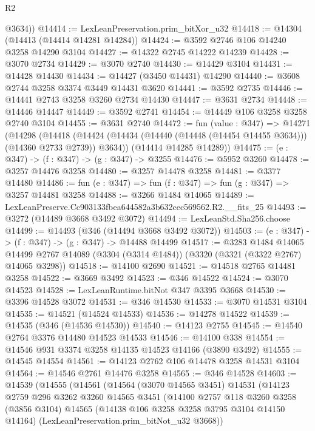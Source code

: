 \begin{lexlean}{R2}
\begin{coremodule}
        @3634))
@14414 := LexLeanPreservation.prim_bitXor_u32
@14418 := @14304 (@14413 (@14414 @14281 @14284))
@14424 := @3592 @2746 @106 @14240 @3258 @14290 @3104
@14427 := @14322 @2745 @14222 @14239
@14428 := @3070 @2734
@14429 := @3070 @2740
@14430 := @14429 @3104
@14431 := @14428 @14430
@14434 := @14427 (@3450 @14431) @14290
@14440 := @3608 @2744 @3258 @3374 @3449 @14431 @3620
@14441 := @3592 @2735
@14446 := @14441 @2743 @3258 @3260 @2734 @14430
@14447 := @3631 @2734
@14448 := @14446 @14447
@14449 := @3592 @2741
@14454 := @14449 @106 @3258 @3258 @2740 @3104
@14455 := @3631 @2740
@14472 := fun (value : @347) =>
  @14271
    (@14298
      (@14418 (@14424 (@14434 (@14440 (@14448 (@14454 @14455 @3634))) (@14360 @2733 @2739)) @3634))
      (@14414 @14285 @14289))
@14475 := (e : @347) -> (f : @347) -> (g : @347) -> @3255
@14476 := @5952 @3260
@14478 := @3257 @14476 @3258
@14480 := @3257 @14478 @3258
@14481 := @3377 @14480
@14486 := fun (e : @347) => fun (f : @347) => fun (g : @347) => @3257 @14481 @3258
@14488 := @3266 @1484 @14065
@14489 := LexLeanPreserve.Cc903133fbea644582a3b632cec569562.R2.__fits_25
@14493 := @3272 (@14489 @3668 @3492 @3072)
@14494 := LexLeanStd.Sha256.choose
@14499 := @14493 (@346 (@14494 @3668 @3492 @3072))
@14503 := (e : @347) -> (f : @347) -> (g : @347) -> @14488 @14499
@14517 := @3283
    @1484
    @14065
    @14499
    @2767
    @14089
    (@3304 (@3314 @1484))
    (@3320 (@3321 (@3322 @2767) @14065 @3298))
@14518 := @14100 @2690
@14521 := @14518 @2765 @14481 @3258
@14522 := @3669 @3492
@14523 := @346 @14522
@14524 := @3070 @14523
@14528 := LexLeanRuntime.bitNot @347 @3395 @3668
@14530 := @3396 @14528 @3072
@14531 := @346 @14530
@14533 := @3070 @14531 @3104
@14535 := @14521 (@14524 @14533)
@14536 := @14278 @14522
@14539 := @14535 (@346 (@14536 @14530))
@14540 := @14123 @2755
@14545 := @14540 @2764 @3376 @14480 @14523 @14533
@14546 := @14100 @338
@14554 := @14546 @931 @3374 @3258 @14135 @14523 @14166 (@3890 @3492)
@14555 := @14545 @14554
@14561 := @14123 @2762 @106 @14478 @3258 @14531 @3104
@14564 := @14546 @2761 @14476 @3258
@14565 := @346 @14528
@14603 := @14539
    (@14555
      (@14561
        (@14564
          (@3070 @14565 @3451)
          @14531
          (@14123
            @2759
            @296
            @3262
            @3260
            @14565
            @3451
            (@14100
              @2757
              @118
              @3260
              @3258
              (@3856 @3104)
              @14565
              (@14138 @106 @3258 @3258 @3795 @3104 @14150 @14164)
              (LexLeanPreservation.prim_bitNot_u32 @3668))

\end{coremodule}
\end{lexlean}
